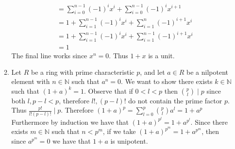 \documentclass[12pt, letterpaper]{article}
\newcommand{\N}{\mathbb{N}}
\begin{document}
\begin{enumerate}
\begin{enumerate}
\begin{align*}
		&= 
		\sum_{i=0}^{n-1} (-1)^i x^i + \sum_{i=0}^{n-1} (-1)^i x^{i+1}\\
		 &= 1 +  \sum_{i=1}^{n-1} (-1)^i x^i + 
		\sum_{i=1}^{n} (-1)^{i+1} x^i \\
		&= 1 +  \sum_{i=1}^{n-1} (-1)^i x^i + 
		\sum_{i=1}^{n-1} (-1)^{i+1} x^i \\
		&= 1
		\end{align*}
		The final line works since $x^n = 0$.  Thus 
		$1+x$ is a unit.  
		\item Let $R$ be a ring with prime 
		characteristic $p$, and let $a \in R$ be a 
		nilpotent element with $n\in \N$ such that 
		$a^n = 0$.  We want to show there exists 
		$k \in \N$ such that $(1+a)^k = 1$.  
		Observe that 
		if $0 < l < p$ then $\binom{p}{l} \mid p$ since 
		both $l, p-l < p$, therefore $l!, (p-l)!$ do not 
		contain the prime factor $p$.  Thus 
		$\frac{p!}{l!(p-l)!} \mid p$.  Therefore 
		$(1+a)^p = \sum_{l=0}^p \binom{p}{l} a^l = 1 + a^p
		$
		Furthermore by induction we have that $(1+a)^{p^l} = 1 + a^{p^l}$.  
		Since there exists $m \in \N$ such that $n < p^m$, if we take $(1+a)^{p^m} = 1 + a^{p^m}$, then 
		since $a^{p^m} = 0$ we have that $1+a$ is unipotent.  
		
	\end{enumerate}
\end{enumerate}
\end{document}

